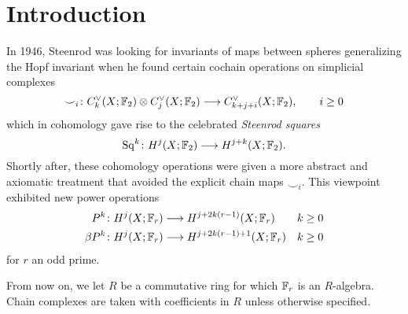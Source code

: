 
\section{Introduction} \label{s:introduction}

In 1946, Steenrod was looking for invariants of maps between spheres generalizing the Hopf invariant when he found certain cochain operations on simplicial complexes
\[\smile_i\colon \ucocadenas[k](X;\bF_2)\otimes \ucocadenas[j](X;\bF_2)\lra \ucocadenas[k+j+i](X;\bF_2),\qquad i\geq 0\]
which in cohomology gave rise to the celebrated \emph{Steenrod squares}
\[\Sq^{k}\colon H^j(X;\bF_2)\lra H^{j+k}(X;\bF_2).\]
Shortly after, these cohomology operations were given a more abstract and axiomatic treatment that avoided the explicit chain maps $\smile_i$. This viewpoint exhibited new power operations
\begin{align*}
	P^{k}\colon H^j(X;\bF_r)&\lra H^{j+2k(r-1)}(X;\bF_r) & k\geq 0 \\
	\beta P^k\colon H^j(X;\bF_r)&\lra H^{j+2k(r-1)+1}(X;\bF_r) & k\geq 0
\end{align*}
for $r$ an odd prime.

From now on, we let $R$ be a commutative ring for which $\bF_r$ is an $R$-algebra. Chain complexes are taken with coefficients in $R$ unless otherwise specified.

